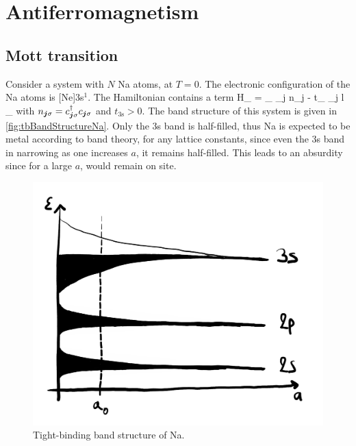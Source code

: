 \chapter{Antiferromagnetism}
	
	\section{Mott transition}

		Consider a system with $N$ Na atoms, at $T=0$. The electronic configuration of the Na atoms is [Ne]3s$^1$. The Hamiltonian contains a term
		\be \mc H_ = \varepsilon_ \sum_{\vb* j \sigma} n_{\vb* j \sigma} - t_ \sum_{\langle \vb* j \vb* l \rangle} \sum_ \ee
		with $n_{\vb* j \sigma} = c^\dagger_{\vb* j \sigma} c_{\vb* j \sigma}$ and $t_\text{3s}>0$.	The band structure of this system is given in  \autoref{fig:tbBandStructureNa}. Only the 3s band is half-filled, thus Na is expected to be metal according to band theory, for any lattice constants, since even the 3s band in narrowing as one increases $a$, it remains half-filled. This leads to an absurdity since for a large $a$, \electron would remain on site.

		\begin{figure}[h!]
			\centering
			\includegraphics[scale=0.2]{graphs/tbBandStructureNa.png}
			\caption{Tight-binding band structure of Na.}
			\label{fig:tbBandStructureNa}
		\end{figure}

